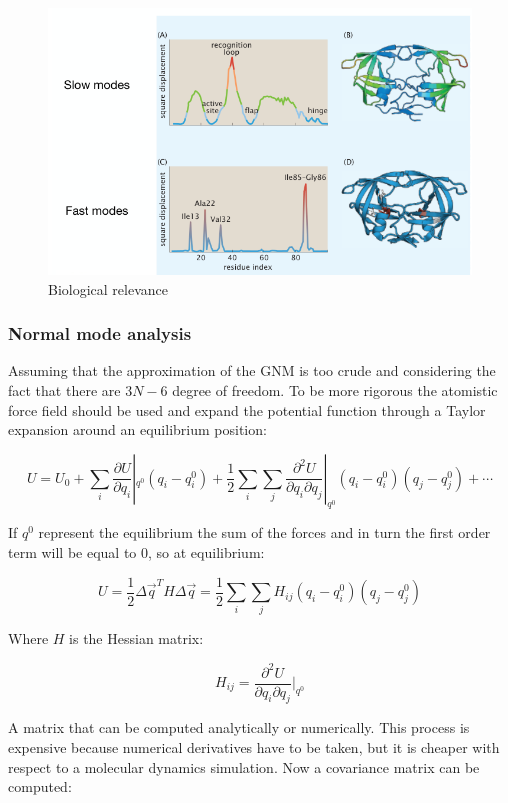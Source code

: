 		\begin{figure}[H]
			\includegraphics[width=\textwidth]{biological-relevance}
			\caption{Biological relevance}
			\label{fig:biological-relevance}
		\end{figure}

		\subsubsection{Normal mode analysis}
		Assuming that the approximation of the GNM is too crude and considering the fact that there are $3N-6$ degree of freedom.
		To be more rigorous the atomistic force field should be used and expand the potential function through a Taylor expansion around an equilibrium position:

		$$U = U_0 + \sum\limits_i\frac{\partial U}{\partial q_i}|_{q^0}(q_i-q_i^0) + \frac{1}{2}\sum\limits_i\sum\limits_j\frac{\partial^2 U}{\partial q_i\partial q_j}|_{q^0}(q_i-q_i^0)(q_j-q_j^0) + \cdots$$

		If $q^0$ represent the equilibrium the sum of the forces and in turn the first order term will be equal to $0$, so at equilibrium:

		$$U = \frac{1}{2}\Delta\vec{q}^TH\Delta\vec{q} = \frac{1}{2}\sum\limits_i\sum\limits_j H_{ij}(q_i-q_i^0)(q_j-q_j^0)$$

		Where $H$ is the Hessian matrix:

		$$H_{ij} = \frac{\partial^2 U}{\partial q_i\partial q_j}|_{q^0}$$

		A matrix that can be computed analytically or numerically.
		This process is expensive because numerical derivatives have to be taken, but it is cheaper with respect to a molecular dynamics simulation.
		Now a covariance matrix can be computed:

